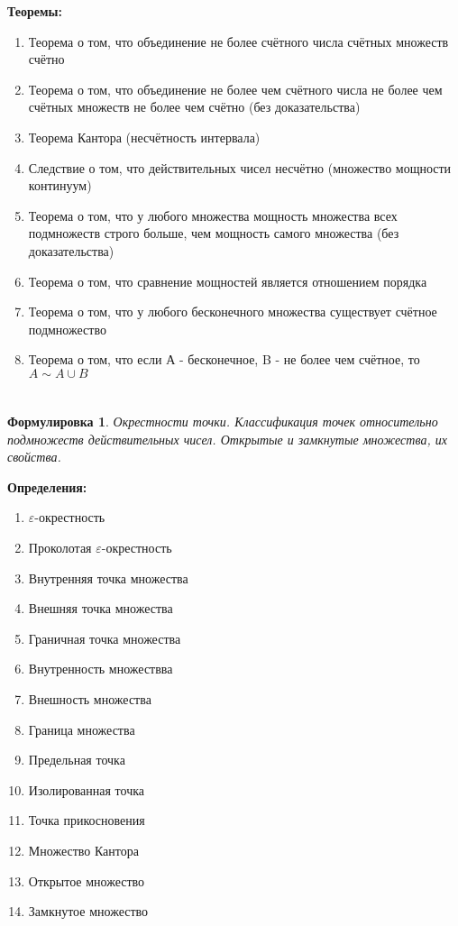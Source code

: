 \documentclass[a4paper]{article}
\renewcommand{\epsilon}{\varepsilon}
\theoremstyle{plain}
\newtheorem*{st}{Формулировка}
\theoremstyle{definition}
\theoremstyle{remark}
\begin{document}
\textbf{Теоремы:}
\begin{enumerate}
    \item Теорема о том, что объединение не более счётного числа счётных множеств счётно
    \item Теорема о том, что объединение не более чем счётного числа не более чем счётных множеств не более чем счётно (без доказательства)
    \item Теорема Кантора (несчётность интервала)
    \item Следствие о том, что действительных чисел несчётно (множество мощности континуум)
    \item Теорема о том, что у любого множества мощность множества всех подмножеств строго больше, чем мощность самого множества (без доказательства)
    \item Теорема о том, что сравнение мощностей является отношением порядка
    \item Теорема о том, что у любого бесконечного множества существует счётное подмножество
    \item Теорема о том, что если А - бесконечное, B - не более чем счётное, то $A \sim A \cup B $
\end{enumerate}


\section{}
\begin{st}
    Окрестности точки. Классификация точек относительно подмножеств действительных чисел. Открытые и замкнутые множества, их свойства.
\end{st}

\textbf{Определения:}
\begin{enumerate}
    \item $\epsilon$-окрестность
    \item Проколотая $\epsilon$-окрестность
    \item Внутренняя точка множества
    \item Внешняя точка множества
    \item Граничная точка множества
    \item Внутренность множествва
    \item Внешность множества
    \item Граница множества
    \item Предельная точка
    \item Изолированная точка
    \item Точка прикосновения
    \item Множество Кантора
    \item Открытое множество
    \item Замкнутое множество
\end{enumerate}
\end{document}
